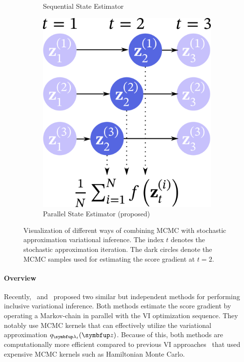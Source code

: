 \begin{figure}
\begin{subfigure}[b]{0.35\textwidth}
        \caption{Sequential State Estimator}\label{fig:seq}
    \end{subfigure}
    \begin{subfigure}[b]{0.3\textwidth}
        \centering
        \includegraphics[scale=0.25]{figures/diagram_3.png}
        \caption{Parallel State Estimator (proposed)}\label{fig:par}
    \end{subfigure}
    \caption{Visualization of different ways of combining MCMC with stochastic approximation variational inference.
    The index \(t\) denotes the stochastic approximation iteration.
    The dark circles denote the MCMC samples used for estimating the score gradient at \(t=2\).
    }\label{fig:overview}
\end{figure}
%

%
\vspace{-0.05in}
\paragraph{Overview}
Recently,~\citet{NEURIPS2020_b2070693} and~\citet{pmlr-v124-ou20a} proposed two similar but independent methods for performing inclusive variational inference.
Both methods estimate the score gradient by operating a Markov-chain in parallel with the VI optimization sequence.
They notably use MCMC kernels that can effectively utilize the variational approximation \(q_{\vlambda_t}(\vz)\).
Because of this, both methods are computationally more efficient compared to previous VI approaches~\citep{pmlr-v97-ruiz19a, pmlr-v70-hoffman17a} that used expensive MCMC kernels such as Hamiltonian Monte Carlo.

